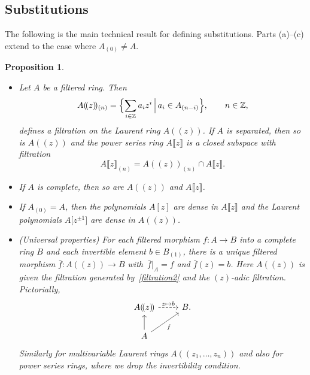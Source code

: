 \documentclass[pdftex]{sigma}
\numberwithin{equation}{section}
\newtheorem{Proposition}[Theorem]{Proposition}
\theoremstyle{definition}
\def\lb{\llbracket}
\def\rb{\rrbracket}
\begin{document}
\subsection{Substitutions}\label{s34}

The following is the main technical result for defining substitutions. Parts (a)--(c) extend \cite[Chapter~III, Section~2.6]{Bour} to the case where $A_{(0)}\neq A$.

\begin{Proposition}\quad
\begin{itemize}\itemsep=0pt
\item[$(a)$]
 Let $A$ be a filtered ring. Then
 \begin{equation}
 \label{filtration2}
 A(\!( z)\!)_{(n)}=\Bigl\{\sum_{i\in\mathbb{Z}} a_iz^i \,\Big|\, a_i\in A_{(n-i)}\Bigr\},\qquad n\in\mathbb{Z},
 \end{equation}
 defines a filtration on the Laurent ring $A(\!( z)\!)$. If $A$ is separated, then so is $A(\!( z)\!)$ and the power series ring $A\lb z\rb$ is a closed subspace with filtration
 \begin{equation}
 \label{filtration3}
 A\lb z\rb_{(n)}=A(\!( z)\!)_{(n)}\cap A\lb z\rb.
 \end{equation}
\item[$(2)$]
 If $A$ is complete, then so are $A(\!( z)\!)$ and $A\lb z\rb$.
\item[$(3)$]
 If $A_{(0)}=A$, then the polynomials $A[z]$ are dense in $A\lb z\rb$ and the Laurent polynomials $A\big[z^{\pm1}\big]$ are dense in $A(\!( z)\!)$.
\item[$(4)$]
\textup(Universal properties\textup) For each filtered morphism $f\colon A\to B$ into a complete ring $B$ and each invertible element $b\in B_{(1)}$, there is a unique filtered morphism $\bar{f}\colon A(\!( z)\!)\to B$ with~${\bar{f}|_{A}=f}$ and $\bar{f}(z)=b$. Here $A(\!( z)\!)$ is given the filtration generated by~\eqref{filtration2} and the $(z)$-adic filtration.
Pictorially,
 \begin{equation}
 \label{EvalCompletionLocalize}
 \begin{tikzcd}
 A(\!( z)\!)\arrow[r,dashed,"{z\mapsto b}"]& B.\\
 A\uar\arrow[ru,"f"']
 \end{tikzcd}
 \end{equation}
 Similarly for multivariable Laurent rings $A(\!( z_1,\dots, z_n)\!)$ and also for power series rings, where we drop the invertibility condition.
\end{itemize}
\end{Proposition}
\end{document}
